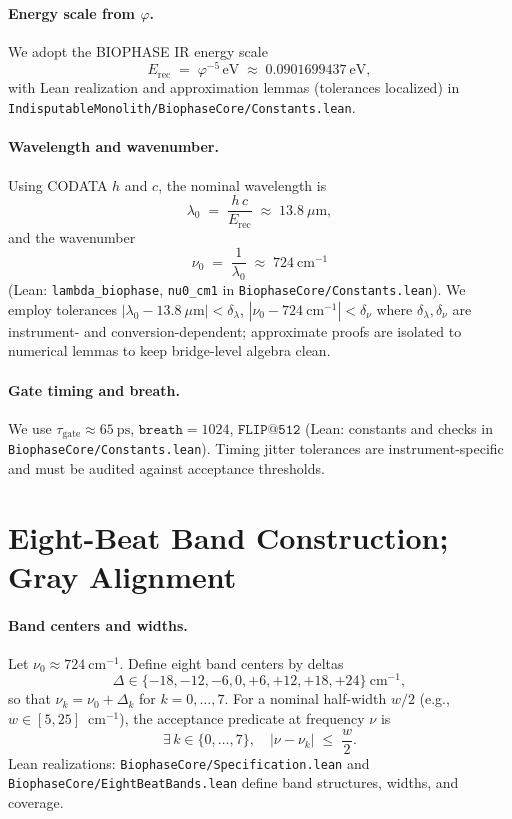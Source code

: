 \documentclass[12pt,a4paper]{article}
\begin{document}
\paragraph{Energy scale from \(\varphi\).}
We adopt the BIOPHASE IR energy scale
\begin{equation}
  E_{\mathrm{rec}} \;=\; \varphi^{-5}\,\mathrm{eV} \;\approx\; 0.0901699437~\mathrm{eV},
\end{equation}
with Lean realization and approximation lemmas (tolerances localized) in \texttt{IndisputableMonolith/BiophaseCore/Constants.lean}. 

\paragraph{Wavelength and wavenumber.}
Using CODATA \(h\) and \(c\), the nominal wavelength is
\begin{equation}
  \lambda_0 \;=\; \frac{h\,c}{E_{\mathrm{rec}}} \;\approx\; 13.8~\mu\mathrm{m},
\end{equation}
and the wavenumber
\begin{equation}
  \nu_0 \;=\; \frac{1}{\lambda_0} \;\approx\; 724~\mathrm{cm}^{-1}
\end{equation}
(Lean: \texttt{lambda\_biophase}, \texttt{nu0\_cm1} in \texttt{BiophaseCore/Constants.lean}). We employ tolerances \(|\lambda_0-13.8~\mu\mathrm{m}|<\delta_{\lambda}\), \(|\nu_0-724~\mathrm{cm}^{-1}|<\delta_{\nu}\) where \(\delta_{\lambda},\delta_{\nu}\) are instrument- and conversion-dependent; approximate proofs are isolated to numerical lemmas to keep bridge-level algebra clean.

\paragraph{Gate timing and breath.}
We use \(\tau_{\mathrm{gate}}\approx 65~\mathrm{ps}\), \(\texttt{breath}=1024\), \(\texttt{FLIP@512}\) (Lean: constants and checks in \texttt{BiophaseCore/Constants.lean}). Timing jitter tolerances are instrument-specific and must be audited against acceptance thresholds.

\section{Eight-Beat Band Construction; Gray Alignment}
\label{app:eightbeat-construction}

\paragraph{Band centers and widths.}
Let \(\nu_0\approx 724~\mathrm{cm}^{-1}\). Define eight band centers by deltas
\[
  \Delta \in \{-18, -12, -6, 0, +6, +12, +18, +24\}~\mathrm{cm}^{-1},
\]
so that \(\nu_k=\nu_0+\Delta_k\) for \(k=0,\dots,7\). For a nominal half-width \(w/2\) (e.g., \(w\in[5,25]\)~cm\(^{-1}\)), the acceptance predicate at frequency \(\nu\) is
\begin{equation}
  \exists\,k\in\{0,\dots,7\},\quad |\nu - \nu_k| \;\le\; \frac{w}{2}.
\end{equation}
Lean realizations: \texttt{BiophaseCore/Specification.lean} and \texttt{BiophaseCore/EightBeatBands.lean} define band structures, widths, and coverage.
\end{document}
